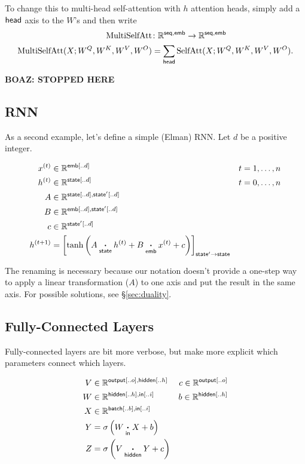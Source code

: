 \documentclass{article}
\newcommand{\reals}{\mathbb{R}}
\begin{document}
To change this to multi-head self-attention with $h$ attention heads, simply add a $\name{head}$ axis to the $W$'s and then write 
\begin{align*}
\text{MultiSelfAtt} &\colon \mathbb{R}^{\name{seq},\name{emb}} \rightarrow \mathbb{R}^{\name{seq},\name{emb}} \\
\text{MultiSelfAtt}(X; W^Q, W^K, W^V, W^O) &= \nsum{head} \text{SelfAtt}(X; W^Q, W^K, W^V, W^O).
\end{align*}



\textbf{BOAZ: STOPPED HERE}


\subsection{RNN}
\label{sec:rnn}

As a second example, let's define a simple (Elman) RNN. Let $d$ be a positive integer.

\begin{align*}
x^{(t)} &\in \mathbb{R}^{\nset{emb}{..d}} & t &= 1, \ldots, n \\
h^{(t)} &\in \mathbb{R}^{\nset{state}{..d}} & t &= 0, \ldots, n\\
A &\in \mathbb{R}^{\nset{state}{..d}, \nset{state'}{..d}} \\
B &\in \mathbb{R}^{\nset{emb}{..d}, \nset{state'}{..d}} \\
c &\in \mathbb{R}^{\nset{state'}{..d}} \\
h^{(t+1)} &= \nmov{state'}{state}{\tanh\left( A \ndot{state} h^{(t)} + B \ndot{emb} x^{(t)} + c \right)}
\end{align*}

The renaming is necessary because our notation doesn't provide a one-step way to apply a linear transformation ($A$) to one axis and put the result in the same axis. For possible solutions, see \S\ref{sec:duality}.

\subsection{Fully-Connected Layers}

Fully-connected layers are bit more verbose, but make more explicit which parameters connect which layers.

\begin{align*} 
V &\in \reals^{\nset{output}{..o}, \nset{hidden}{..h}} & c\in \reals^{\nset{output}{..o}} \\
W &\in \reals^{{\nset{hidden}{..h}, \nset{in}{..i}}} & b \in \reals^{\nset{hidden}{..h}} \\
X &\in \reals^{{\nset{batch}{..b}, \nset{in}{..i}}} \\
Y &= \sigma \left( W \ndot{in} X + b \right) \\
Z &= \sigma \left( V \ndot{hidden} Y + c \right)  
\end{align*}
\end{document}
